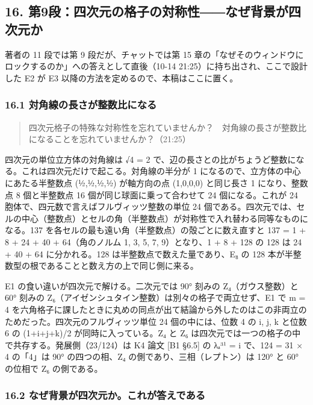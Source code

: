 \documentclass[
  a4paper,
]{ltjsarticle}
\begin{document}
\subsection{16.
第9段：四次元の格子の対称性――なぜ背景が四次元か}\label{ux7b2c9ux6bb5ux56dbux6b21ux5143ux306eux683cux5b50ux306eux5bfeux79f0ux6027ux306aux305cux80ccux666fux304cux56dbux6b21ux5143ux304b}

著者の 11 段では第 9 段だが、チャットでは第 15
章の「なぜそのウィンドウにロックするのか」への答えとして直後（10-14
21:25）に持ち出され、ここで設計した E2 が E3
以降の方法を定めるので、本稿はここに置く。

\subsubsection{16.1
対角線の長さが整数比になる}\label{ux5bfeux89d2ux7ddaux306eux9577ux3055ux304cux6574ux6570ux6bd4ux306bux306aux308b}

\begin{quote}
四次元格子の特殊な対称性を忘れていませんか？　対角線の長さが整数比になることを忘れていませんか？（21:25）
\end{quote}

四次元の単位立方体の対角線は √4 = 2
で、辺の長さとの比がちょうど整数になる。これは四次元だけで起こる。対角線の半分が
1 になるので、立方体の中心にあたる半整数点 (½,½,½,½) が軸方向の点
(1,0,0,0) と同じ長さ 1 になり、整数点 8 個と半整数点 16
個が同じ球面に乗って合わせて 24 個になる。これが 24
胞体で、四元数で言えばフルヴィッツ整数の単位 24
個である。四次元では、セルの中心（整数点）とセルの角（半整数点）が対称性で入れ替わる同等なものになる。137
を各セルの最も遠い角（半整数点）の殻ごとに数え直すと 137 = 1 + 8 + 24 +
40 + 64（角のノルム 1, 3, 5, 7, 9）となり、1 + 8 + 128 の 128 は 24 + 40
+ 64 に分かれる。128 は半整数点で数えた量であり、E₈ の 128
本が半整数型の根であることと数え方の上で同じ側に来る。

E1 の食い違いが四次元で解ける。二次元では 90° 刻みの Z₄（ガウス整数）と
60° 刻みの Z₆（アイゼンシュタイン整数）は別々の格子で両立せず、E1 で m =
4
を六角格子に課したときに丸めの同点が出て結論から外したのはこの非両立のためだった。四次元のフルヴィッツ単位
24 個の中には、位数 4 の i, j, k と位数 6 の (1+i+j+k)/2
が同時に入っている。Z₄ と Z₆
は四次元では一つの格子の中で共存する。発展側（23/124）は K4 論文 {[}B1
§6.5{]} の λₐ³¹ = i で、124 = 31 × 4 の「4」は 90° の四つの相、Z₄
の側であり、三相（レプトン）は 120° と 60° の位相で Z₆ の側である。

\subsubsection{16.2
なぜ背景が四次元か。これが答えである}\label{ux306aux305cux80ccux666fux304cux56dbux6b21ux5143ux304bux3053ux308cux304cux7b54ux3048ux3067ux3042ux308b}
\end{document}
